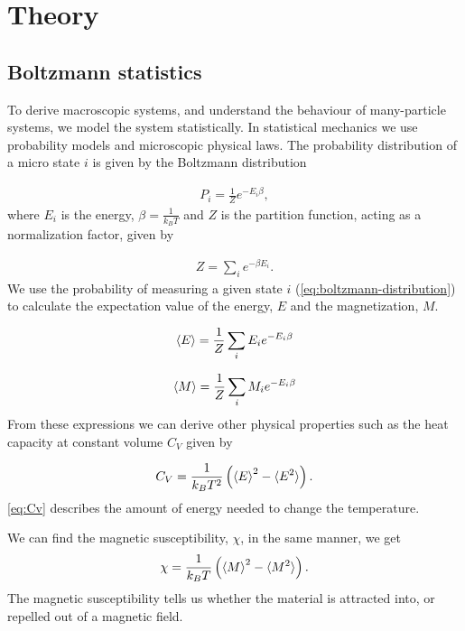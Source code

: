 \documentclass[../main.tex]{subfiles}
\begin{document}
\section{Theory}\label{sec:theory}
\subsection{Boltzmann statistics}
To derive macroscopic systems, and understand the behaviour of many-particle systems, we model the system statistically. In statistical mechanics we use probability models and microscopic physical laws. The probability distribution of a micro state $i$ is given by the Boltzmann distribution

\begin{align}
    P_i=\frac{1}{Z}e^{-E_i\beta},
    \label{eq:boltzmann-distribution}
\end{align} where $E_i$ is the energy, \ensuremath{\beta=\frac{1}{k_BT}} and $Z$ is the partition function, acting as a normalization factor, given by

\begin{align}
    Z=\sum_i e^{-\beta E_i}. 
\end{align} We use the probability of measuring a given state $i$ (\cref{eq:boltzmann-distribution}) to calculate the expectation value of the energy, $E$ and the magnetization, $M$. 

\begin{align}
    \braket{E} = \frac{1}{Z}\sum_i E_i e^{-E_i\beta}
    \label{eq:exp-e}
\end{align}

\begin{align}
    \braket{M} = \frac{1}{Z}\sum_i M_i e^{-E_i\beta}
    \label{eq:exp-m}
\end{align} From these expressions we can derive other physical properties such as the heat capacity at constant volume $C_V$ given by

\begin{align}
    C_V=\frac{1}{k_B T^2}\left(\braket{E}^2-\braket{E^2}\right).
    \label{eq:Cv}
\end{align} \cref{eq:Cv} describes the amount of energy needed to change the temperature. 

We can find the magnetic susceptibility, $\chi$, in the same manner, we get 
\begin{align}
    \chi = \frac{1}{k_BT}\left(\braket{M}^2-\braket{M^2}\right).
    \label{eq:chi}
\end{align} The magnetic susceptibility tells us whether the material is attracted into, or repelled out of a magnetic field. 
\end{document}
